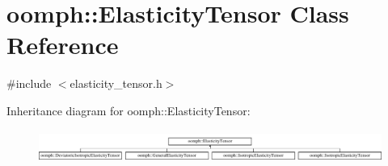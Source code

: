 \hypertarget{classoomph_1_1ElasticityTensor}{}\section{oomph\+:\+:Elasticity\+Tensor Class Reference}
\label{classoomph_1_1ElasticityTensor}


{\ttfamily \#include $<$elasticity\+\_\+tensor.\+h$>$}

Inheritance diagram for oomph\+:\+:Elasticity\+Tensor\+:\begin{figure}[H]
\begin{center}
\leavevmode
\includegraphics[height=1.085271cm]{classoomph_1_1ElasticityTensor}
\end{center}
\end{figure}
